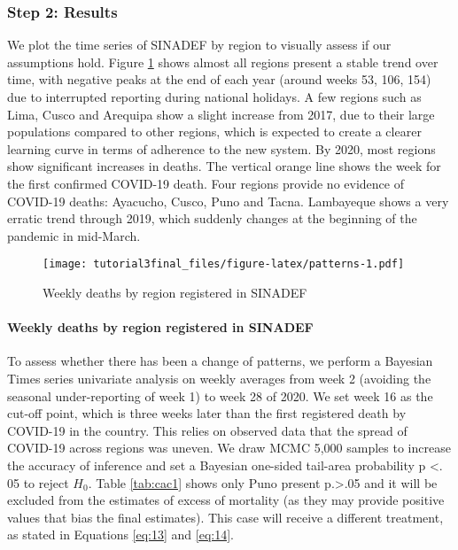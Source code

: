 \documentclass[
]{article}
\begin{document}
\hypertarget{step-2-results}{%
\subsubsection{Step 2: Results}\label{step-2-results}}

We plot the time series of SINADEF by region to visually assess if our assumptions hold. Figure \ref{fig:patterns} shows almost all regions present a stable trend over time, with negative peaks at the end of each year (around weeks 53, 106, 154) due to interrupted reporting during national holidays. A few regions such as Lima, Cusco and Arequipa show a slight increase from 2017, due to their large populations compared to other regions, which is expected to create a clearer learning curve in terms of adherence to the new system. By 2020, most regions show significant increases in deaths. The vertical orange line shows the week for the first confirmed COVID-19 death. Four regions provide no evidence of COVID-19 deaths: Ayacucho, Cusco, Puno and Tacna. Lambayeque shows a very erratic trend through 2019, which suddenly changes at the beginning of the pandemic in mid-March.

\begin{figure}
\centering
\texttt{[image: tutorial3final\_files/figure-latex/patterns-1.pdf]}
\caption{\label{fig:patterns}Weekly deaths by region registered in SINADEF}
\end{figure}

\hypertarget{weekly-deaths-by-region-registered-in-sinadef}{%
\paragraph{Weekly deaths by region registered in SINADEF}\label{weekly-deaths-by-region-registered-in-sinadef}}

To assess whether there has been a change of patterns, we perform a Bayesian Times series univariate analysis on weekly averages from week 2 (avoiding the seasonal under-reporting of week 1) to week 28 of 2020. We set week 16 as the cut-off point, which is three weeks later than the first registered death by COVID-19 in the country. This relies on observed data that the spread of COVID-19 across regions was uneven. We draw MCMC 5,000 samples to increase the accuracy of inference and set a Bayesian one-sided tail-area probability p \textless. 05 to reject \(H_0\). Table \ref{tab:cac1} shows only Puno present p.\textgreater.05 and it will be excluded from the estimates of excess of mortality (as they may provide positive values that bias the final estimates). This case will receive a different treatment, as stated in Equations \eqref{eq:13} and \eqref{eq:14}.
\end{document}
